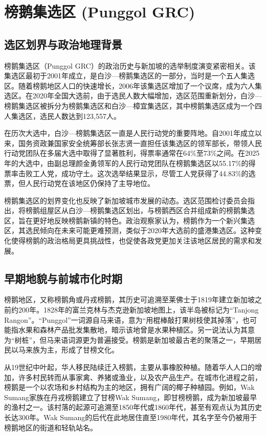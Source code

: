 \documentclass[11pt,a4paper,twoside,openany]{book}
\begin{document}
\chapter{榜鹅集选区 (Punggol GRC)}

\section{选区划界与政治地理背景}
榜鹅集选区（Punggol GRC）的政治历史与新加坡的选举制度演变紧密相关。该集选区最初于2001年成立，是白沙—榜鹅集选区的一部分，当时是一个五人集选区。随着榜鹅地区人口的快速增长，2006年该集选区增加了一个议席，成为六人集选区。在2020年全国大选前，由于选民人数大幅增加，选区范围重新划分，白沙—榜鹅集选区被拆分为榜鹅集选区和白沙—樟宜集选区，其中榜鹅集选区成为一个四人集选区，选民人数达到123,557人。

在历次大选中，白沙—榜鹅集选区一直是人民行动党的重要阵地。自2001年成立以来，国务资政兼国家安全统筹部长张志贤一直担任该集选区的领军部长，带领人民行动党团队在多届大选中取得了显著胜利，得票率通常在64\%至73\%之间。在2025年的大选中，由副总理颜金勇领军的人民行动党团队在榜鹅集选区以55.17\%的得票率击败工人党，成功守土。这次选举结果显示，尽管工人党获得了44.83\%的选票，但人民行动党在该地区仍保持了主导地位。

榜鹅集选区的划界变化也反映了新加坡城市发展的动态。选区范围检讨委员会指出，将榜鹅组屋区从白沙—榜鹅集选区划出，与榜鹅西区合并组成新的榜鹅集选区，旨在更好地反映榜鹅新镇的特色。政治观察家认为，榜鹅作为一个新兴集选区，其选民倾向在未来可能更难预测，类似于2020年大选前的盛港集选区。这种变化使得榜鹅的政治格局更具挑战性，也促使各政党更加关注该地区居民的需求和发展。

\section{早期地貌与前城市化时期}
榜鹅地区，又称榜鹅角或丹戎榜鹅，其历史可追溯至莱佛士于1819年建立新加坡之前约200年。1828年的富兰克林与杰克逊新加坡地图上，该半岛被标记为“Tanjong Rangon”。“Punggol”一词源自马来语，意为“用棍棒敲打果树枝使其掉落”，也可能指水果和森林产品批发集散地，暗示该地曾是水果种植区。另一说法认为其意为“树桩”，但马来语词源更为普遍接受。榜鹅是新加坡最古老的聚落之一，早期居民以马来族为主，形成了甘榜文化。

从19世纪中叶起，华人移民陆续迁入榜鹅，主要从事橡胶种植。随着华人人口的增加，许多村民转而从事家禽、养猪或渔业，以及农产品生产。在城市化进程之前，榜鹅是一个以农场和乡村结构为主的地区，拥有广阔的椰子种植园。例如，Wak Sumang家族在丹戎榜鹅建立了甘榜Wak Sumang，即甘榜榜鹅，成为新加坡最早的渔村之一。该村落的起源可追溯至1850年代或1860年代，甚至有观点认为其历史长达300年。Wak Sumang的后代在此地居住直至1980年代，其名字至今仍被用于榜鹅地区的街道和轻轨站名。
\end{document}

